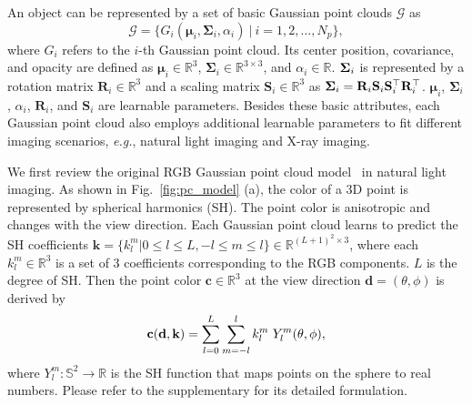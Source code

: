 \documentclass[runningheads]{llncs}
\begin{document}
An object can be represented by a set of basic Gaussian point clouds $\mathcal{G}$ as
\begin{equation}
    \mathcal{G} = \{G_i(\bm{\mu}_i, \mathbf{\Sigma}_i, \alpha_i)~|~i = 1, 2, \dots, N_p\},
\end{equation}
where $G_i$ refers to the $i$-th Gaussian point cloud. Its center position, covariance, and opacity are defined as $\bm{\mu}_i \in \mathbb{R}^3$, $\mathbf{\Sigma}_i \in \mathbb{R}^{3\times3}$, and $\alpha_i \in \mathbb{R}$. 
$\mathrm{\bf \Sigma}_i$ is represented by a rotation matrix $\mathbf{R}_i \in \mathbb{R}^3$ and a scaling matrix $\mathbf{S}_i \in \mathbb{R}^3$ as $\mathrm{\bf \Sigma}_i = \mathbf{R}_i \mathbf{S}_i \mathbf{S}_i^\top \mathbf{R}_i^\top$. $\bm{\mu}_i$, $\mathbf{\Sigma}_i$, $\alpha_i$, $\mathbf{R}_i$, and $\mathbf{S}_i$ are learnable parameters. Besides these basic attributes, each Gaussian point cloud also employs additional learnable parameters to fit different imaging scenarios, \emph{e.g.}, natural light imaging and X-ray imaging.

We first review the original RGB Gaussian point cloud model~\cite{3dgs} in natural light imaging.  As shown in Fig.~\ref{fig:pc_model} (a),  the color of a 3D point is represented by spherical harmonics (SH). The point color is anisotropic and changes with the view direction. Each Gaussian point cloud learns to predict the SH coefficients $\mathbf{k} = \{k_l^m | 0 \leq l \leq L, -l \leq m \leq l\} \in \mathbb{R}^{(L+1)^2\times 3}$, where each $k_l^m \in \mathbb{R}^{3}$ is a set of 3 coefficients corresponding to the RGB components. $L$ is the degree of SH. Then the point color $\mathbf{c} \in \mathbb{R}^{3}$ at the view direction $\mathbf{d} = (\theta, \phi)$ is derived by
\vspace{-1.6mm}
\begin{equation}
	\small
	\mathbf{c}(\mathbf{d}, \mathbf{k}) = \sum_{l  = 0}^{L} \sum_{m = -l}^{l} k_l^m~Y_l^m(\theta, \phi),
	\label{eq:original_pc_model}
\vspace{-1.4mm}
\end{equation}
where  $Y_l^m: \mathbb{S}^2 \rightarrow \mathbb{R}$ is the SH function that maps points on the sphere to real numbers. Please refer to the supplementary for its detailed formulation.
\end{document}

